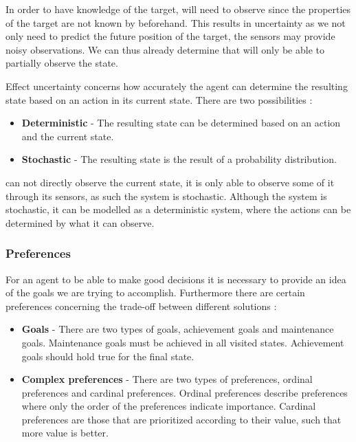 In order to have knowledge of the target, \name will need to observe since the
properties of the target are not known by \name beforehand. This results in
uncertainty as we not only need to predict the future position of the target,
the sensors may provide noisy observations. We can thus already determine that
\name will only be able to partially observe the state.\nl

Effect uncertainty concerns how accurately the agent can determine the resulting
state based on an action in its current state. There are two possibilities
\citep[ch.1.5.4]{MIBook}:
\begin{itemize}
  \item \textbf{Deterministic} - The resulting state can be determined based on
  an action and the current state.
  \item \textbf{Stochastic} - The resulting state is the result of a probability
  distribution.
\end{itemize}

\name can not directly observe the current state, it is only able
to observe some of it through its sensors, as such the system is stochastic.
Although the system is stochastic, it can be modelled as a deterministic system, where
the actions can be determined by what it can observe.
 
\subsubsection{Preferences}
For an agent to be able to make good decisions it is necessary to provide an
idea of the goals we are trying to accomplish. Furthermore there are certain
preferences concerning the trade-off between different solutions
\citep[ch.1.5.5]{MIBook}:

\begin{itemize}
  \item \textbf{Goals} - There are two types of goals, achievement goals and
  maintenance goals. Maintenance goals must be achieved in all visited states.
  Achievement goals should hold true for the final state.
  \item \textbf{Complex preferences} - There are two types of preferences,
  ordinal preferences and cardinal preferences. Ordinal preferences describe
  preferences where only the order of the preferences indicate importance.
  Cardinal preferences are those that are prioritized according to their value,
  such that more value is better.
\end{itemize}

